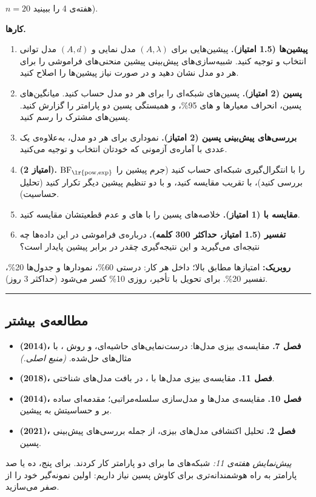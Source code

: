 \(n = 20\) هفته‌ی 4 را ببینید).

\textbf{کارها.}

\begin{enumerate}
\def\labelenumi{\arabic{enumi}.}
\tightlist
\item
  \textbf{پیشین‌ها (1.5 امتیاز).} پیشین‌هایی برای \((A, \lambda)\) مدل
  نمایی و \((A, d)\) مدل توانی انتخاب و توجیه کنید. شبیه‌سازی‌های پیش‌بینی
  پیشین منحنی‌های فراموشی را برای هر دو مدل نشان دهید و در صورت نیاز
  پیشین‌ها را اصلاح کنید.
\item
  \textbf{پسین (2 امتیاز).} پسین‌های شبکه‌ای را برای هر دو مدل حساب کنید.
  میانگین‌های پسین، انحراف معیارها و های 95\%، و همبستگی پسین دو
  پارامتر را گزارش کنید. پسین‌های مشترک را رسم کنید.
\item
  \textbf{بررسی‌های پیش‌بینی پسین (2 امتیاز).}  نموداری برای هر دو
  مدل، به‌علاوه‌ی یک  عددی با آماره‌ی آزمونی که خودتان انتخاب و
  توجیه می‌کنید.
\item
  \textbf{ (2 امتیاز).}
  \(\mathrm{BF}_{\text{\lr{pow,exp}}}\) را با انتگرال‌گیری شبکه‌ای حساب کنید
  (جرم پیشین را بررسی کنید)، با تقریب  مقایسه کنید، و با دو
  تنظیم پیشین دیگر تکرار کنید (تحلیل حساسیت).
\item
  \textbf{مقایسه با  (1 امتیاز).} خلاصه‌های پسین را با های
   و عدم قطعیتشان مقایسه کنید.
\item
  \textbf{تفسیر (1.5 امتیاز، حداکثر 300 کلمه).} درباره‌ی فراموشی در این
  داده‌ها چه نتیجه‌ای می‌گیرید و این نتیجه‌گیری چقدر در برابر پیشین پایدار
  است؟
\end{enumerate}

\textbf{روبریک:} امتیازها مطابق بالا؛ داخل هر کار: درستی 60\%، نمودارها
و جدول‌ها 20\%، تفسیر 20\%. برای تحویل با تأخیر، روزی 10\% کسر می‌شود
(حداکثر 3 روز).

\begin{center}\rule{0.5\linewidth}{0.5pt}\end{center}

\subsection{مطالعه‌ی بیشتر}

\begin{itemize}
\tightlist
\item
  \textbf{ \lr{\&}  (2014)، فصل 7.} مقایسه‌ی بیزی
  مدل‌ها: درست‌نمایی‌های حاشیه‌ای،  و روش
  ، با مثال‌های حل‌شده. \emph{(منبع اصلی.)}
\item
  \textbf{ \lr{\&}  (2018)، فصل 11.} مقایسه‌ی بیزی
  مدل‌ها با ، در بافت مدل‌های شناختی.
\item
  \textbf{ (2014)، فصل 10.} مقایسه‌ی مدل‌ها و مدل‌سازی
  سلسله‌مراتبی؛ مقدمه‌ای ساده بر  و حساسیتش به پیشین.
\item
  \textbf{ \lr{\&}  (2021)، فصل 2.} تحلیل اکتشافی
  مدل‌های بیزی، از جمله بررسی‌های پیش‌بینی پسین.
\end{itemize}

\emph{پیش‌نمایش هفته‌ی 11:} شبکه‌های ما برای دو پارامتر کار کردند. برای
پنج، ده یا صد پارامتر به راه هوشمندانه‌تری برای کاوش پسین نیاز داریم:
 اولین نمونه‌گیر خود را از صفر می‌سازید.
